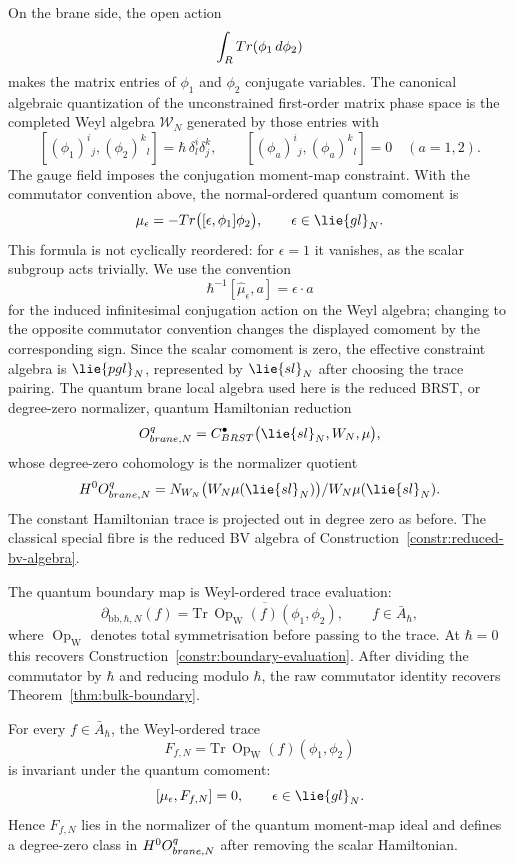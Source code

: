 \documentclass[11pt]{memoir}
\begin{document}
On the brane side, the open action
$$\int_{R}Tr(\phi_1\,d\phi_2)$$
makes the matrix entries of $\phi_1$ and $\phi_2$ conjugate variables.
The canonical algebraic quantization of the unconstrained first-order matrix
phase space is the completed Weyl algebra
$\mathcal W_N$ generated by those entries with
$$[(\phi_1)^i{}_j,(\phi_2)^k{}_l]
  =\hbar\,\delta^i_l\delta^k_j,\qquad
  [(\phi_a)^i{}_j,(\phi_a)^k{}_l]=0\quad(a=1,2).$$
The gauge field imposes the conjugation moment-map constraint. With the
commutator convention above, the normal-ordered quantum comoment is
$$\widehat\mu_\epsilon=-\mathrm{Tr}\bigl([\epsilon,\phi_1]\phi_2\bigr),
  \qquad \epsilon\in\lie{gl}_N.$$
This formula is not cyclically reordered: for $\epsilon=1$ it vanishes, as the
scalar subgroup acts trivially. We use the convention
$$\hbar^{-1}[\widehat\mu_\epsilon,a]=\epsilon\cdot a$$
for the induced infinitesimal conjugation action on the Weyl algebra; changing
to the opposite commutator convention changes the displayed comoment by the
corresponding sign.  Since the scalar comoment is zero, the effective
constraint algebra is \(\lie{pgl}_N\), represented by
\(\lie{sl}_N\) after choosing the trace pairing.  The quantum brane
local algebra used here is the reduced BRST, or degree-zero normalizer,
quantum Hamiltonian reduction
$$\mc O^{\mathrm q}_{\mathrm{brane},N}
  =C^\bullet_{\mathrm{BRST}}
    \bigl(\lie{sl}_N,\mathcal W_N,\widehat\mu\bigr),$$
whose degree-zero cohomology is the normalizer quotient
$$H^0\mc O^{\mathrm q}_{\mathrm{brane},N}
  =\mathrm N_{\mathcal W_N}
    \bigl(\mathcal W_N\widehat\mu(\lie{sl}_N)\bigr)/
    \mathcal W_N\widehat\mu(\lie{sl}_N).$$
The constant Hamiltonian trace is projected out in degree zero as before. The
classical special fibre is the reduced BV algebra of
Construction~\ref{constr:reduced-bv-algebra}.

The quantum boundary map is Weyl-ordered trace evaluation:
$$\partial_{\mathrm{bb},\hbar,N}(f)
  =\overline{\mathrm{Tr}\,\operatorname{Op}_{\mathrm W}(f)(\phi_1,\phi_2)},
  \qquad f\in\bar A_\hbar,$$
where $\operatorname{Op}_{\mathrm W}$ denotes total symmetrisation before
passing to the trace. At $\hbar=0$ this recovers
Construction~\ref{constr:boundary-evaluation}. After dividing the commutator by
$\hbar$ and reducing modulo $\hbar$, the raw commutator identity recovers
Theorem~\ref{thm:bulk-boundary}.

\begin{prop}\label{prop:quantum-boundary-descends}
  For every $f\in\bar A_\hbar$, the Weyl-ordered trace
  $$F_{f,N}=\mathrm{Tr}\,\operatorname{Op}_{\mathrm W}(f)(\phi_1,\phi_2)$$
  is invariant under the quantum comoment:
  $$[\widehat\mu_\epsilon,F_{f,N}]=0,\qquad \epsilon\in\lie{gl}_N.$$
  Hence $F_{f,N}$ lies in the normalizer of the quantum moment-map ideal and
  defines a degree-zero class in
  $H^0O^{q}_{brane,N}$ after removing the scalar
  Hamiltonian.
\end{prop}
\end{document}
